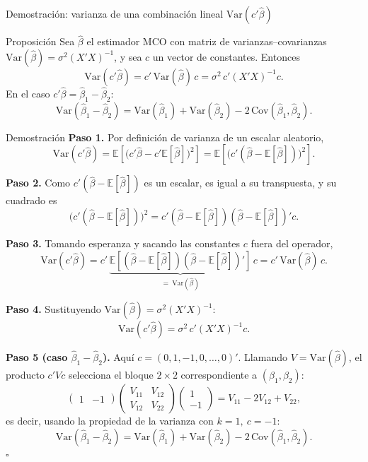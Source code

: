 \documentclass{beamer}
\begin{document}
\begin{frame}[allowframebreaks]{Demostración: varianza de una combinación lineal $\text{Var}(c'\hat{\beta})$}
\begin{alertblock}{Proposición}
Sea $\hat{\beta}$ el estimador MCO con matriz de varianzas--covarianzas $\text{Var}(\hat{\beta})=\sigma^2(X'X)^{-1}$, y sea $c$ un vector de constantes. Entonces
\[
\text{Var}(c'\hat{\beta}) = c'\,\text{Var}(\hat{\beta})\,c = \sigma^2\, c'(X'X)^{-1}c.
\]
En el caso $c'\hat{\beta}=\hat{\beta}_1-\hat{\beta}_2$:
\[
\text{Var}(\hat{\beta}_1-\hat{\beta}_2) = \text{Var}(\hat{\beta}_1) + \text{Var}(\hat{\beta}_2) - 2\,\text{Cov}(\hat{\beta}_1,\hat{\beta}_2).
\]
\end{alertblock}

\begin{exampleblock}{Demostración}
\textbf{Paso 1.} Por definición de varianza de un escalar aleatorio,
\[
\text{Var}(c'\hat{\beta}) = \mathbb{E}\!\left[\big(c'\hat{\beta} - c'\mathbb{E}[\hat{\beta}]\big)^2\right]
= \mathbb{E}\!\left[\big(c'(\hat{\beta}-\mathbb{E}[\hat{\beta}])\big)^2\right].
\]

\textbf{Paso 2.} Como $c'(\hat{\beta}-\mathbb{E}[\hat{\beta}])$ es un escalar, es igual a su transpuesta, y su cuadrado es
\[
\big(c'(\hat{\beta}-\mathbb{E}[\hat{\beta}])\big)^2 = c'(\hat{\beta}-\mathbb{E}[\hat{\beta}])(\hat{\beta}-\mathbb{E}[\hat{\beta}])'c.
\]

\textbf{Paso 3.} Tomando esperanza y sacando las constantes $c$ fuera del operador,
\[
\text{Var}(c'\hat{\beta}) = c'\,\underbrace{\mathbb{E}\!\left[(\hat{\beta}-\mathbb{E}[\hat{\beta}])(\hat{\beta}-\mathbb{E}[\hat{\beta}])'\right]}_{=\ \text{Var}(\hat{\beta})}\,c = c'\,\text{Var}(\hat{\beta})\,c.
\]

\framebreak

\textbf{Paso 4.} Sustituyendo $\text{Var}(\hat{\beta})=\sigma^2(X'X)^{-1}$:
\[
\text{Var}(c'\hat{\beta}) = \sigma^2\, c'(X'X)^{-1}c.
\]

\textbf{Paso 5 (caso $\hat{\beta}_1-\hat{\beta}_2$).} Aquí $c=(0,1,-1,0,\dots,0)'$. Llamando $V=\text{Var}(\hat{\beta})$, el producto $c'Vc$ selecciona el bloque $2\times 2$ correspondiente a $(\beta_1,\beta_2)$:
\[
\begin{pmatrix}1 & -1\end{pmatrix}
\begin{pmatrix} V_{11} & V_{12}\\ V_{12} & V_{22}\end{pmatrix}
\begin{pmatrix}1\\ -1\end{pmatrix}
= V_{11} - 2V_{12} + V_{22},
\]
es decir, usando la propiedad de la varianza con $k=1,\ c=-1$:
\[
\text{Var}(\hat{\beta}_1-\hat{\beta}_2) = \text{Var}(\hat{\beta}_1) + \text{Var}(\hat{\beta}_2) - 2\,\text{Cov}(\hat{\beta}_1,\hat{\beta}_2).
\]
\hfill $\square$
\end{exampleblock}
\end{frame}
\end{document}
